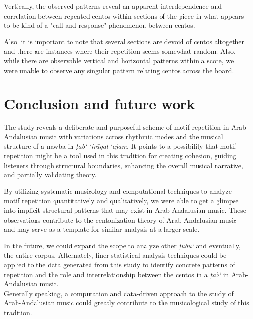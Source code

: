 \documentclass{article}
\begin{document}
Vertically, the observed patterns reveal an apparent interdependence and correlation between repeated centos within sections of the piece in what appears to be kind of a "call and response" phenomenon between centos.

Also, it is important to note that several sections are devoid of centos altogether and there are instances where their repetition seems somewhat random. Also, while there are observable vertical and horizontal patterns within a score, we were unable to observe any singular pattern relating centos across the board.

\section{Conclusion and future work}\label{sec:Conclusion}

The study reveals a deliberate and purposeful scheme of motif repetition in Arab-Andalusian music with variations across rhythmic modes and the musical structure of a nawba in \textit{ṭab‘ ‘irāqal-‘ajam}. It points to a possibility that motif repetition might be a tool used in this tradition for creating cohesion, guiding listeners through structural boundaries, enhancing the overall musical narrative, and partially validating \cite{Chaachoo2011} theory.

By utilizing systematic musicology and computational techniques to analyze motif repetition quantitatively and qualitatively, we were able to get a glimpse into implicit structural patterns that may exist in Arab-Andalusian music. These observations contribute to the centonization theory of Arab-Andalusian music and may serve as a template for similar analysis at a larger scale. 

In the future, we could expand the scope to analyze other \textit{ṭubū‘} and eventually, the entire corpus. Alternately, finer statistical analysis techniques could be applied to the data generated from this study to identify concrete patterns of repetition and the role and interrelationship between the centos in a \textit{ṭab‘} in Arab-Andalusian music.\\

Generally speaking, a computation and data-driven approach to the study of Arab-Andalusian music could greatly contribute to the musicological study of this tradition. 







\newpage


\end{document}
